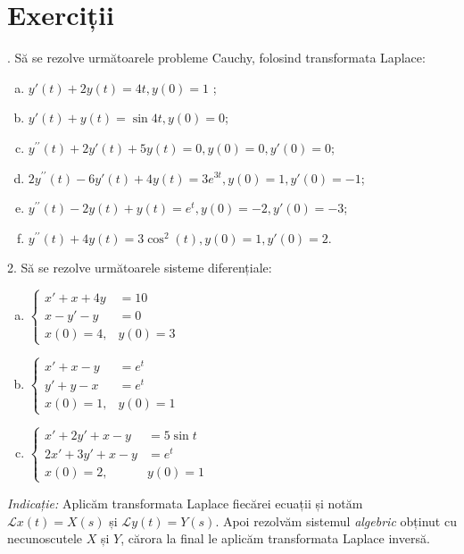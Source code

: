 \documentclass[12pt,a4paper]{article}
\newcommand\Lap{\mathcal{L}}
\theoremstyle{dotless}
\theoremstyle{dotlessdr}
\begin{document}

\section*{Exerciții}

\indent{}. Să se rezolve următoarele probleme Cauchy, folosind transformata
Laplace:
\begin{enumerate}[(a)]
\item $ y'(t) + 2y(t) = 4t, y(0) = 1 $ ;
\item $ y'(t) + y(t) = \sin 4t, y(0) = 0 $;
\item $ y^{\prime\prime}(t) + 2y'(t) + 5y(t) = 0, y(0) = 0, y'(0) = 0 $;
\item $ 2y^{\prime\prime}(t) - 6y'(t) + 4y(t) = 3e^{3t}, y(0) = 1, y'(0) = -1 $;
\item $ y^{\prime\prime}(t) - 2y(t) + y(t) = e^t, y(0) = -2, y'(0) = -3 $;
\item $ y^{\prime\prime}(t) + 4y(t) = 3\cos^2(t), y(0) = 1, y'(0) = 2 $.  
\end{enumerate}


\vspace{1cm}

2. Să se rezolve următoarele sisteme diferențiale:
\begin{enumerate}[(a)]
\item $
  \begin{cases}
    x' + x + 4y &= 10 \\
    x - y' - y &= 0 \\
    x(0) = 4, & y(0) = 3
  \end{cases}
  $
\item $
  \begin{cases}
    x' + x - y &= e^t \\
    y' + y - x &= e^t \\
    x(0) = 1, & y(0) = 1
  \end{cases}
  $
\item $
  \begin{cases}
    x' + 2y' + x - y &= 5 \sin t \\
    2x' + 3y' + x - y &= e^t \\
    x(0) = 2, & y(0) = 1
  \end{cases}
  $
\end{enumerate}

\emph{Indicație:} Aplicăm transformata Laplace fiecărei ecuații
și notăm $ \Lap x(t) = X(s) $ și $ \Lap y(t) = Y(s) $. Apoi rezolvăm sistemul
\emph{algebric} obținut cu necunoscutele $ X $ și $ Y $, cărora la final le
aplicăm transformata Laplace inversă.
\end{document}
